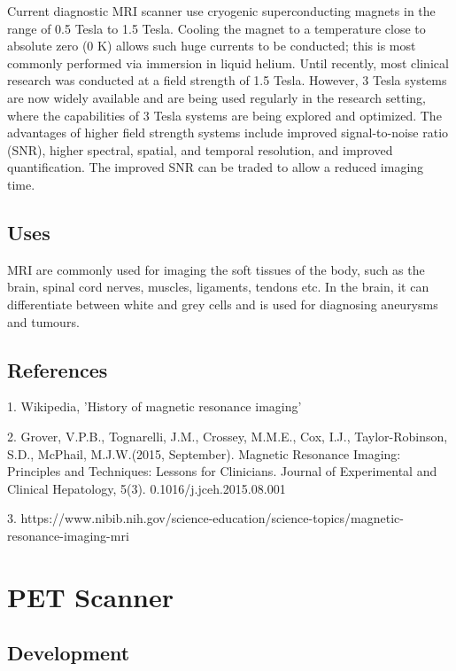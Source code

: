\documentclass[11pt]{article}
\begin{document}
Current diagnostic MRI scanner use cryogenic superconducting magnets in the range of 0.5 Tesla to 1.5 Tesla. Cooling the magnet to a temperature close to absolute zero (0 K) allows such huge currents to be conducted; this is most commonly performed via immersion in liquid helium. Until recently, most clinical research was conducted at a field strength of 1.5 Tesla. However, 3 Tesla systems are now widely available and are being used regularly in the research setting, where the capabilities of 3 Tesla systems are being explored and optimized. The advantages of higher field strength systems include improved signal-to-noise ratio (SNR), higher spectral, spatial, and temporal resolution, and improved quantification. The improved SNR can be traded to allow a reduced imaging time.

\subsection*{Uses}

MRI are commonly used for imaging the soft tissues of the body, such as the brain, spinal cord nerves, muscles, ligaments, tendons etc. In the brain, it can differentiate between white and grey cells and is used for diagnosing aneurysms and tumours. 

\subsection*{\centering References}

1. Wikipedia, 'History of magnetic resonance imaging'

2. Grover, V.P.B., Tognarelli, J.M., Crossey, M.M.E., Cox, I.J., Taylor-Robinson, S.D., McPhail, M.J.W.(2015, September). Magnetic Resonance Imaging: Principles and Techniques: Lessons for Clinicians. Journal of Experimental and Clinical Hepatology, 5(3). 0.1016/j.jceh.2015.08.001

3. https://www.nibib.nih.gov/science-education/science-topics/magnetic-resonance-imaging-mri

\pagebreak

\section*{\centering PET Scanner}

\subsection*{Development}
\end{document}
